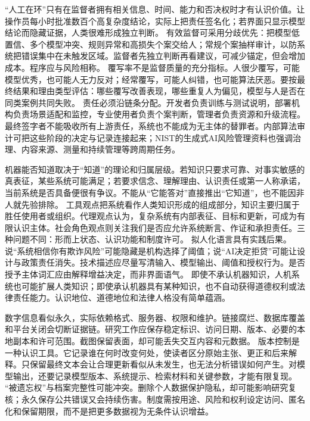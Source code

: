 “人工在环”只有在监督者拥有相关信息、时间、能力和否决权时才有认识价值。让操作员每小时批准数百个高复杂度结论，实际上把责任签名化；若界面只显示模型结论而隐藏证据，人类很难形成独立判断。 有效监督可采用分歧优先：把模型低置信、多个模型冲突、规则异常和高损失个案交给人；常规个案抽样审计，以防系统把错误集中在未触发区域。监督者先独立判断再看建议，可减少锚定，但会增加成本。程序应与风险相称。 覆写率不是监督质量的充分指标。人很少覆写，可能模型优秀，也可能人无力反对；经常覆写，可能人纠错，也可能算法厌恶。要按最终结果和理由类型评估：哪些覆写改善表现，哪些重复人为偏见，模型与人是否在同类案例共同失败。 责任必须沿链条分配。开发者负责训练与测试说明，部署机构负责场景适配和监控，专业使用者负责个案判断，管理者负责资源和升级流程。最终签字者不能吸收所有上游责任，系统也不能成为无主体的替罪者。内部算法审计可把这些阶段的决定与记录连接起来\parencite{raji2020}；NIST的生成式AI风险管理资料也强调治理、内容来源、测量和持续管理等跨周期任务\parencite{nist2024}。

机器能否知道取决于“知道”的理论和归属层级。若知识只要求可靠、对事实敏感的真表征，某些系统可能满足；若要求信念、理解理由、认识责任或第一人称承诺，当前系统是否具备便很有争议。不能从“它能答对”直接推出“它知道”，也不能因非人就先验排除。 工具观点把系统看作人类知识形成的组成部分，知识主要归属于胜任使用者或组织。代理观点认为，复杂系统有内部表征、目标和更新，可成为有限认识主体。社会角色观点则关注我们是否应允许系统断言、作证和承担责任。三种问题不同：形而上状态、认识功能和制度许可。 拟人化语言具有实践后果。说“系统相信你有欺诈风险”可能隐藏是机构选择了阈值；说“AI决定拒贷”可能让设计与政策责任消失。技术描述应尽量写清输入、模型输出、阈值和授权行为。是否授予主体词汇应由解释增益决定，而非界面语气。 即使不承认机器知识，人机系统也可能扩展人类知识；即使承认机器具有某种知识，也不自动获得道德权利或法律责任能力。认识地位、道德地位和法律人格没有简单蕴涵。

数字信息看似永久，实际依赖格式、服务器、权限和维护。链接腐烂、数据库覆盖和平台关闭会切断证据链。研究工作应保存稳定标识、访问日期、版本、必要的本地副本和许可范围。截图保留表面，却可能丢失交互内容和元数据。 版本控制是一种认识工具。它记录谁在何时改变何处，使读者区分原始主张、更正和后来解释。只保留最终文本会让合理更新看似从未发生，也无法分析错误如何产生。对模型输出，还要记录模型版本、系统提示、检索材料和关键参数，才能有限复现。 “被遗忘权”与档案完整性可能冲突。删除个人数据保护隐私，却可能影响研究复核；永久保存公共错误又会持续伤害。制度需按用途、风险和权利设定访问、匿名化和保留期限，而不是把更多数据视为无条件认识增益。

